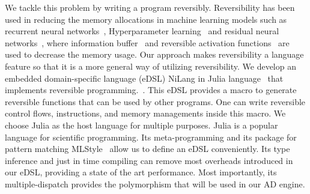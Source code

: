 \documentclass[aps,twocolumn,longbibliography,english,superscriptaddress]{revtex4-1}
\newcommand{\<}{\langle}
\renewcommand{\>}{\rangle}
\theoremstyle{definition}\newtheorem{definition}{\textit{Definition}}
\begin{document}
    We tackle this problem by writing a program reversibly. Reversibility has been used in reducing the memory allocations in machine learning models such as recurrent neural networks~\cite{MacKay2018}, Hyperparameter learning~\cite{Maclaurin2015} and residual neural networks~\cite{Behrmann2018}, where information buffer~\cite{Maclaurin2015} and reversible activation functions~\cite{Gomez2017,Jacobsen2018} are used to decrease the memory usage.
    Our approach makes reversibility a language feature so that it is a more general way of utilizing reversibility.
    We develop an embedded domain-specific language (eDSL) NiLang in Julia language~\cite{Bezanson2012,Bezanson2017} that implements reversible programming.~\cite{Perumalla2013,Frank2017}. This eDSL provides a macro to generate reversible functions that can be used by other programs. One can write reversible control flows, instructions, and memory managements inside this macro.
We choose Julia as the host language for multiple purposes. Julia is a popular language for scientific programming. Its meta-programming and its package for pattern matching MLStyle~\cite{MLStyle} allow us to define an eDSL conveniently. Its type inference and just in time compiling can remove most overheads introduced in our eDSL, providing a state of the art performance. Most importantly, its multiple-dispatch provides the polymorphism that will be used in our AD engine.
\end{document}
